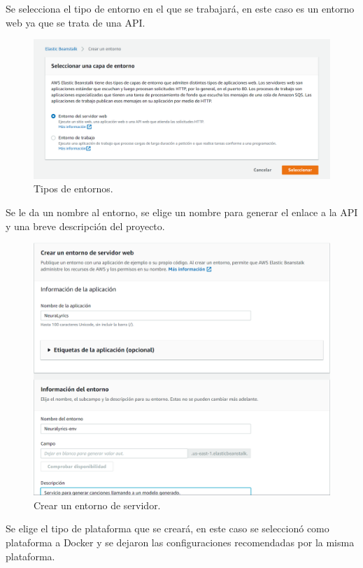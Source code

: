 \documentclass[12pt, a4paper, titlepage]{article}
\begin{document}
		Se selecciona el tipo de entorno en el que se trabajará, en este caso es un entorno web ya que se trata de una API.
		\begin{figure}[H]
			\includegraphics[width=12cm]{./Imagenes/BackEnd/paso_1.png}
			\centering 
			\caption{Tipos de entornos.}
		\end{figure}
		Se le da un nombre al entorno, se elige un nombre para generar el enlace a la API y una breve descripción del proyecto.
		\begin{figure}[H]
			\includegraphics[width=12cm]{./Imagenes/BackEnd/paso_2.png}
			\centering 
			\caption{Crear un entorno de servidor.}
		\end{figure}
		Se elige el tipo de plataforma que se creará, en este caso se seleccionó como plataforma a Docker y se dejaron las configuraciones recomendadas por la misma plataforma.
\end{document}
